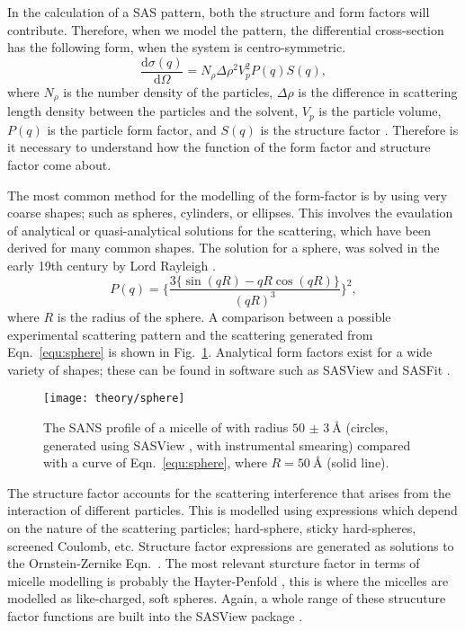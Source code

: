 In the calculation of a SAS pattern, both the structure and form factors will contribute.
Therefore, when we model the pattern, the differential cross-section has the following form, when the system is centro-symmetric.
%
\begin{equation}
	\frac{\text{d}\sigma(q)}{\text{d}\Omega} = N_\rho\Delta\rho^2V_p^2 P(q)S(q),
\end{equation}
%
where $N_\rho$ is the number density of the particles, $\Delta\rho$ is the difference in scattering length density between the particles and the solvent, $V_p$ is the particle volume, $P(q)$ is the particle form factor, and $S(q)$ is the structure factor \cite{Pedersen2002a}.
Therefore is it necessary to understand how the function of the form factor and structure factor come about.

The most common method for the modelling of the form-factor is by using very coarse shapes; such as spheres, cylinders, or ellipses.
This involves the evaulation of analytical or quasi-analytical solutions for the scattering, which have been derived for many common shapes.
The solution for a sphere, was solved in the early 19th century by Lord Rayleigh \cite{Pedersen2002a}.
%
\begin{equation}
	P(q) = \Bigg\{\frac{3\big\{\sin(qR) - qR\cos(qR)\big\}}{(qR)^3}\Bigg\}^2,
	\label{equ:sphere}
\end{equation}
%
where $R$ is the radius of the sphere. A comparison between a possible experimental scattering pattern and the scattering generated from Eqn.~\ref{equ:sphere} is shown in Fig.~\ref{fig:sphere}. Analytical form factors exist for a wide variety of shapes; these can be found in software such as SASView and SASFit \cite{sasview2018, sasfit2018}.
%
\begin{figure}
	\centering
	\texttt{[image: theory/sphere]}
	\caption{The SANS profile of a micelle of  with radius $\SI{50(3)}{\angstrom}$ (circles, generated using SASView \cite{sasview2018}, with instrumental smearing) compared with a curve of Eqn.~\ref{equ:sphere}, where $R = \SI{50}{\angstrom}$ (solid line).}
	\label{fig:sphere}
\end{figure}
%

The structure factor accounts for the scattering interference that arises from the interaction of different particles.
This is modelled using expressions which depend on the nature of the scattering particles; hard-sphere, sticky hard-spheres, screened Coulomb, etc.
Structure factor expressions are generated as solutions to the Ornstein-Zernike Eqn.~\cite{Klein2002}.
The most relevant sturcture factor in terms of micelle modelling is probably the Hayter-Penfold \cite{Hayter1981}, this is where the micelles are modelled as like-charged, soft spheres.
Again, a whole range of these strucuture factor functions are built into the SASView package \cite{sasview2018}.

